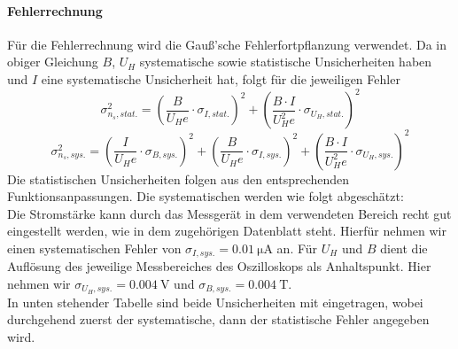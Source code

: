 \paragraph{Fehlerrechnung} Für die Fehlerrechnung wird die Gauß'sche Fehlerfortpflanzung verwendet. Da in obiger Gleichung $B$, $U_H$ systematische sowie statistische Unsicherheiten haben und $I$ eine systematische Unsicherheit hat, folgt für die jeweiligen Fehler
$$\sigma _{n_s, stat.}^{2} = (\frac{B}{U_H e} \cdot \sigma _{I, stat.})^{2} + (\frac{B \cdot I}{U_H^{2} e} \cdot \sigma _{U_H, stat.})^{2}$$
$$\sigma _{n_s, sys.}^{2} = (\frac{I}{U_H e} \cdot \sigma _{B, sys.})^{2} + (\frac{B}{U_H e} \cdot \sigma _{I, sys.})^{2} + (\frac{B \cdot I}{U_H^{2} e} \cdot \sigma _{U_H, sys.})^{2}$$
Die statistischen Unsicherheiten folgen aus den entsprechenden Funktionsanpassungen. Die systematischen werden wie folgt abgeschätzt: \\
Die Stromstärke kann durch das Messgerät in dem verwendeten Bereich recht gut eingestellt werden, wie in dem zugehörigen Datenblatt steht. Hierfür nehmen wir einen systematischen Fehler von $\sigma _{I, sys.} = 0.01 \ \mathrm{\mu A}$ an. Für $U_H$ und $B$ dient die Auflösung des jeweilige Messbereiches des Oszilloskops als Anhaltspunkt. Hier nehmen wir $\sigma _{U_H, sys.} = 0.004 \ \mathrm{V}$ und $\sigma _{B, sys.} = 0.004 \ \mathrm{T}$. \\
In unten stehender Tabelle sind beide Unsicherheiten mit eingetragen, wobei durchgehend zuerst der systematische, dann der statistische Fehler angegeben wird.

